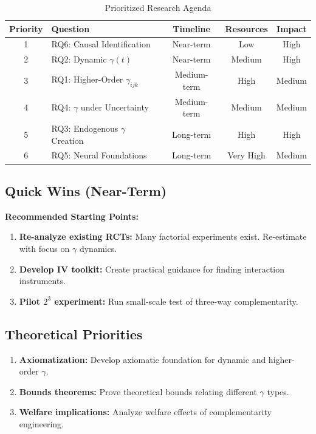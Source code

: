 \begin{table}[h]
\centering
\caption{Prioritized Research Agenda}
\label{tab:roadmap}
\renewcommand{\arraystretch}{1.3}
\begin{tabular}{@{}clccc@{}}
\toprule
\textbf{Priority} & \textbf{Question} & \textbf{Timeline} & \textbf{Resources} & \textbf{Impact} \\
\midrule
1 & RQ6: Causal Identification & Near-term & Low & High \\
2 & RQ2: Dynamic $\gamma(t)$ & Near-term & Medium & High \\
3 & RQ1: Higher-Order $\gamma_{ijk}$ & Medium-term & High & Medium \\
4 & RQ4: $\gamma$ under Uncertainty & Medium-term & Medium & Medium \\
5 & RQ3: Endogenous $\gamma$ Creation & Long-term & High & High \\
6 & RQ5: Neural Foundations & Long-term & Very High & Medium \\
\bottomrule
\end{tabular}
\end{table}

\subsection{Quick Wins (Near-Term)}

\begin{tcolorbox}[colback=green!5!white,colframe=green!75!black]
\textbf{Recommended Starting Points:}

\begin{enumerate}
    \item \textbf{Re-analyze existing RCTs:} Many factorial experiments exist. Re-estimate with focus on $\gamma$ dynamics.

    \item \textbf{Develop IV toolkit:} Create practical guidance for finding interaction instruments.

    \item \textbf{Pilot $2^3$ experiment:} Run small-scale test of three-way complementarity.
\end{enumerate}
\end{tcolorbox}

\subsection{Theoretical Priorities}

\begin{enumerate}
    \item \textbf{Axiomatization:} Develop axiomatic foundation for dynamic and higher-order $\gamma$.

    \item \textbf{Bounds theorems:} Prove theoretical bounds relating different $\gamma$ types.

    \item \textbf{Welfare implications:} Analyze welfare effects of complementarity engineering.
\end{enumerate}

